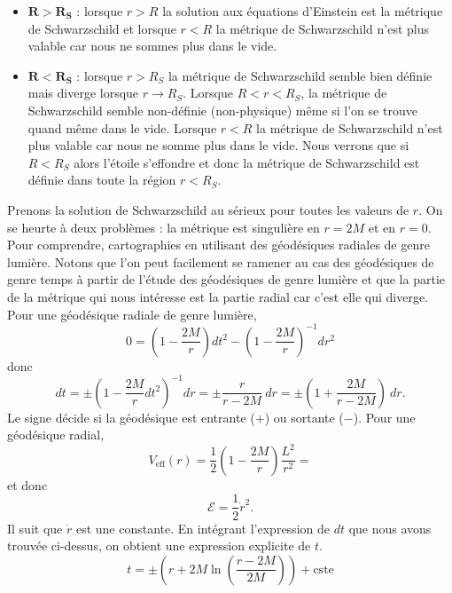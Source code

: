 \documentclass[a4paper,11pt]{report}
\begin{document}
            \begin{itemize}[label = \textbullet]
                \item $\bm{R>R_S}$ : lorsque $r>R$ la solution aux équations d'Einstein est la métrique de Schwarzschild et lorsque $r<R$ la métrique de Schwarzschild n'est plus valable car nous ne sommes plus dans le vide.
                \item $\bm{R<R_S}$ : lorsque $r>R_S$ la métrique de Schwarzschild semble bien définie mais diverge lorsque $r\to R_S$. Lorsque $R<r<R_S$, la métrique de Schwarzschild semble non-définie (non-physique) même si l'on se trouve quand même dans le vide. Lorsque $r<R$ la métrique de Schwarzschild n'est plus valable car nous ne somme plus dans le vide. Nous verrons que si $R<R_S$ alors l'étoile s'effondre et donc la métrique de Schwarzschild est définie dans toute la région $r<R_S$.
                \comp
            \end{itemize}
            
            Prenons la solution de Schwarzschild au sérieux pour toutes les valeurs de $r$. On se heurte à deux problèmes : la métrique est singulière en $r=2M$ et en $r=0$. Pour comprendre, cartographies en utilisant des géodésiques radiales de genre lumière. Notons que l'on peut facilement se ramener au cas des géodésiques de genre temps à partir de l'étude des géodésiques de genre lumière et que la partie de la métrique qui nous intéresse est la partie radial car c'est elle qui diverge. Pour une géodésique radiale de genre lumière,
            \begin{equation}
                0 = \left( 1-\frac{2M}{r} \right)dt^2 - \left( 1-\frac{2M}{r} \right)^{-1}dr^2
            \end{equation}
            donc
            \begin{equation}
                 dt = \pm \left( 1-\frac{2M}{r}dt^2 \right)^{-1} dr = \pm \frac{r}{r-2M}~dr = \pm\left( 1+\frac{2M}{r-2M} \right)~dr.
            \end{equation}
            Le signe décide si la géodésique est entrante ($+$) ou sortante ($-$). Pour une géodésique radial, 
            \begin{equation}
                V_{\text{eff}}(r) = \frac{1}{2}\left( 1-\frac{2M}{r} \right)\frac{L^2}{r^2} = 
            \end{equation}
            et donc
            \begin{equation}
                \mathscr{E} = \frac{1}{2}\dot{r}^2.
            \end{equation}
            Il suit que $\dot{r}$ est une constante. En intégrant l'expression de $dt$ que nous avons trouvée ci-dessus, on obtient une expression explicite de $t$.
            \begin{equation}
                t = \pm\left( r+2M\ln\left( \frac{r-2M}{2M} \right) \right) +  \text{cste}
            \end{equation}
            
\end{document}
